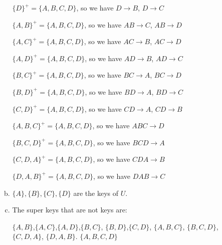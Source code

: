 \documentclass[12pt]{article}
\begin{document}
\begin{enumerate}[1.]
\begin{enumerate}[i)]
\begin{enumerate}[a)]
\begin{mdframed}
                $\{D\}^+ = \{A,B,C,D\}$, so we have $D \to B$, $D \to C$

                \bigskip

                $\{A,B\}^+ = \{A,B,C,D\}$, so we have $AB \to C$, $AB \to D$

                \bigskip

                \color{red}$\{A,C\}^+ = \{A,B,C,D\}$, so we have $AC \to B$, $AC \to D$\color{black}

                \bigskip

                \color{red}$\{A,D\}^+ = \{A,B,C,D\}$, so we have $AD \to B$, $AD \to C$\color{black}

                \bigskip

                $\{B,C\}^+ = \{A,B,C,D\}$, so we have $BC \to A$, $BC \to D$

                \bigskip

                $\{B,D\}^+ = \{A,B,C,D\}$, so we have $BD \to A$, $BD \to C$

                \bigskip

                $\{C,D\}^+ = \{A,B,C,D\}$, so we have $CD \to A$, $CD \to B$

                \bigskip

                $\{A,B,C\}^+ = \{A,B,C,D\}$, so we have $ABC \to D$

                \bigskip

                $\{B,C,D\}^+ = \{A,B,C,D\}$, so we have $BCD \to A$

                \bigskip

                $\{C,D,A\}^+ = \{A,B,C,D\}$, so we have $CDA \to B$

                \bigskip

                $\{D,A,B\}^+ = \{A,B,C,D\}$, so we have $DAB \to C$

            \end{mdframed}

            \bigskip

            \item

            $\{A\},\{B\},\{C\},\{D\}$ are the keys of $U$.

            \item

            The super keys that are not keys are:

            \bigskip

            $\{A,B\}$,$\{A,C\}$,$\{A,D\}$,$\{B,C\}$, $\{B,D\}$,$\{C,D\}$, $\{A,B,C\}$,
            $\{B,C,D\}$, $\{C,D,A\}$, $\{D,A,B\}$. $\{A,B,C,D\}$


\end{enumerate}
\end{enumerate}
\end{enumerate}
\end{document}
